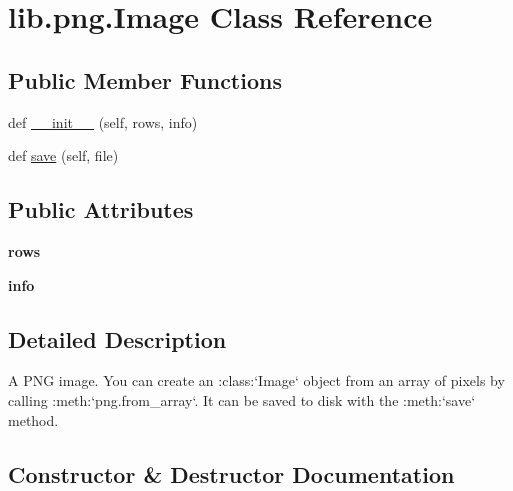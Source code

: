 \hypertarget{classlib_1_1png_1_1_image}{}\section{lib.\+png.\+Image Class Reference}
\label{classlib_1_1png_1_1_image}
\subsection*{Public Member Functions}
\begin{DoxyCompactItemize}
\item 
def \hyperlink{classlib_1_1png_1_1_image_a827bc243e8b9d57519bc9ccd17b167fb}{\+\_\+\+\_\+init\+\_\+\+\_\+} (self, rows, info)
\item 
def \hyperlink{classlib_1_1png_1_1_image_a5bee5a78ede9adcf53821412cf15340b}{save} (self, file)
\end{DoxyCompactItemize}
\subsection*{Public Attributes}
\begin{DoxyCompactItemize}
\item 
\mbox{\label{classlib_1_1png_1_1_image_a934d6eefd983405ee8214152815d556e}} 
{\bfseries rows}
\item 
\mbox{\label{classlib_1_1png_1_1_image_a7e75ec1ee7188db5c474073716a9eba8}} 
{\bfseries info}
\end{DoxyCompactItemize}


\subsection{Detailed Description}
\begin{DoxyVerb}A PNG image.  You can create an :class:`Image` object from
an array of pixels by calling :meth:`png.from_array`.  It can be
saved to disk with the :meth:`save` method.
\end{DoxyVerb}
 

\subsection{Constructor \& Destructor Documentation}
\mbox{\label{classlib_1_1png_1_1_image_a827bc243e8b9d57519bc9ccd17b167fb}} 
